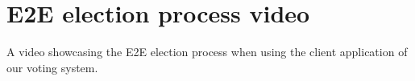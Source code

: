 \chapter{E2E election process video}\label{ch:video-of-e2e-election-process}

A video showcasing the \gls{E2E} election process when using the client application of our voting system.
